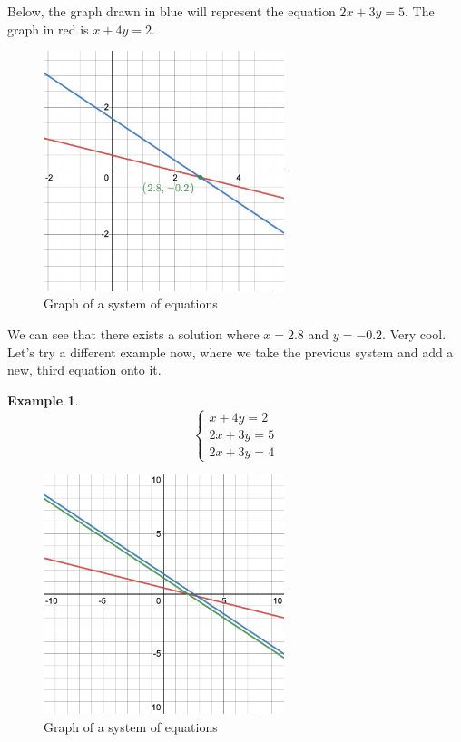 \documentclass{scrbook}
\theoremstyle{definition}
\newtheorem{example}{Example}
\begin{document}
Below, the graph drawn in blue will represent the equation $2x + 3y = 5$. The graph in red is $x + 4y = 2$. 

\begin{figure}[H]
  \includegraphics[width=7cm]{system-of-eqs.png}
  \centering
  \caption{Graph of a system of equations}
\end{figure}

We can see that there exists a solution where $x=2.8$ and $y = -0.2$. Very cool. Let's try a different example now, where we take the previous system and add a new, third equation onto it. 

\begin{example}
  \[
    \begin{cases}
      x + 4y = 2\\
      2x + 3y = 5\\
      2x + 3y = 4
    \end{cases}
  \]
\end{example}

\begin{figure}[H]
  \includegraphics[width=7cm]{system-of-eqs(2).png}
  \centering
  \caption{Graph of a system of equations}
\end{figure}
\end{document}

